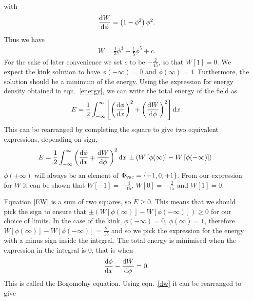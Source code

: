 \documentclass[11pt, oneside]{article}  	%
\numberwithin{equation}{section}
\newcommand{\drv}{\ensuremath{\textup{d}}}
\begin{document}
with
\begin{equation}\label{dw}
    \frac{\textup{d}W}{\textup{d}\phi} = \left ( 1 - \phi^2 \right ) \phi^2.
\end{equation}
Thus we have
\begin{align}
    W = \frac{1}{3}\phi^3 - \frac{1}{5}\phi^5 +c.
\end{align}
For the sake of later convenience we set $c$ to be $-\frac{2}{15}$, so that $W[1]=0$. We expect the kink solution to have $\phi (-\infty )= 0$ and $\phi (\infty )= 1$. Furthermore, the solution should be a minimum of the energy. Using the expression for energy density obtained in eqn.~\ref{energy}, we can write the total energy of the field as
\begin{equation}\label{EW}
    E = \frac{1}{2} \int_{-\infty}^{\infty} \left [ \left(\frac{\textup{d}\phi}{\textup{d}x}\right)^2 + \left(\frac{\textup{d}W}{\textup{d}\phi}\right)^2 \right ]\drv x.
\end{equation}
This can be rearranged by completing the square to give two equivalent expressions, depending on sign,
\begin{equation}\label{energy_bogo}
    E = \frac{1}{2} \int_{-\infty}^{\infty}\left (  \frac{\textup{d}\phi}{\textup{d}x} \mp \frac{\textup{d}W}{\textup{d}\phi} \right )^2 \drv x  \, \pm \left( W\left [  \phi(\infty)\right ]  -  W\left [  \phi(-\infty)\right ]\right).
\end{equation}
$\phi(\pm\infty)$ will always be an element of $\Phi_{\textup{vac}} = \left \{ -1,0,+1\right \}$. From our expression for $W$ it can be shown that $W[-1] = -\frac{4}{15}$, $W[0] = -\frac{2}{15}$ and $W[1] = 0$.\par
Equation \ref{EW} is a sum of two squares, so $E\geqslant 0$. This means that we should pick the sign to ensure that $ \pm \left( W\left [  \phi(\infty)\right ]  -  W\left [  \phi(-\infty)\right ]\right) \geqslant 0$ for our choice of limits. In the case of the kink, $\phi(-\infty) = 0,\, \phi(\infty) = 1 $, therefore $W\left [  \phi(\infty)\right ]  -  W\left [  \phi(-\infty)\right ] = \frac{2}{15}$ and so we pick the expression for the energy with a minus sign inside the integral. The total energy is minimised when the expression in the integral is 0, that is when
\begin{equation}\label{bogo}
    \frac{\textup{d}\phi}{\textup{d}x} - \frac{\textup{d}W}{\textup{d}\phi} = 0.
\end{equation}
This is called the Bogomolny equation. Using eqn.~\ref{dw} it can be rearranged to give
\end{document}
